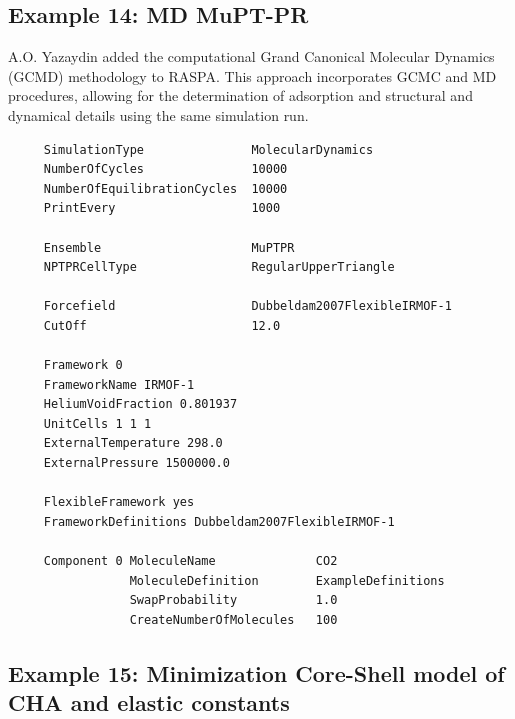 \subsection*{Example 14: MD MuPT-PR}

A.O. Yazaydin added the computational Grand Canonical Molecular Dynamics (GCMD) methodology to RASPA\cite{Loganathan2017,Loganathan2018}.
This approach incorporates GCMC and MD procedures, allowing for the determination of adsorption and structural and 
dynamical details using the same simulation run.
\begin{tiny}
\begin{verbatim}
     SimulationType               MolecularDynamics
     NumberOfCycles               10000
     NumberOfEquilibrationCycles  10000
     PrintEvery                   1000
     
     Ensemble                     MuPTPR
     NPTPRCellType                RegularUpperTriangle
     
     Forcefield                   Dubbeldam2007FlexibleIRMOF-1
     CutOff                       12.0
     
     Framework 0
     FrameworkName IRMOF-1
     HeliumVoidFraction 0.801937
     UnitCells 1 1 1
     ExternalTemperature 298.0
     ExternalPressure 1500000.0
     
     FlexibleFramework yes
     FrameworkDefinitions Dubbeldam2007FlexibleIRMOF-1
     
     Component 0 MoleculeName              CO2
                 MoleculeDefinition        ExampleDefinitions
                 SwapProbability           1.0
                 CreateNumberOfMolecules   100
\end{verbatim}
\end{tiny}

\subsection*{Example 15: Minimization Core-Shell model of CHA and elastic constants}

